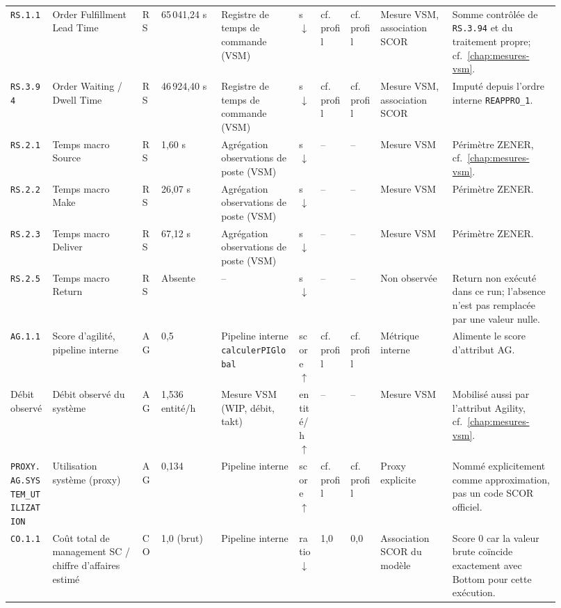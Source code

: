 \begin{landscape}
{\begin{longtable}{L{0.07\linewidth} L{0.15\linewidth} L{0.035\linewidth} L{0.10\linewidth} L{0.13\linewidth} L{0.035\linewidth} L{0.05\linewidth} L{0.05\linewidth} L{0.12\linewidth} L{0.18\linewidth}}
\texttt{RS.1.1} & Order Fulfillment Lead Time & RS & 65\,041,24 s & Registre de temps de commande (VSM) & s $\downarrow$ & cf.~profil & cf.~profil & Mesure VSM, association SCOR & Somme contrôlée de \texttt{RS.3.94} et du traitement propre; cf.~\cref{chap:mesures-vsm}. \\
\texttt{RS.3.94} & Order Waiting / Dwell Time & RS & 46\,924,40 s & Registre de temps de commande (VSM) & s $\downarrow$ & cf.~profil & cf.~profil & Mesure VSM, association SCOR & Imputé depuis l'ordre interne \texttt{REAPPRO\_1}. \\
\texttt{RS.2.1} & Temps macro Source & RS & 1,60 s & Agrégation observations de poste (VSM) & s $\downarrow$ & -- & -- & Mesure VSM & Périmètre ZENER, cf.~\cref{chap:mesures-vsm}. \\
\texttt{RS.2.2} & Temps macro Make & RS & 26,07 s & Agrégation observations de poste (VSM) & s $\downarrow$ & -- & -- & Mesure VSM & Périmètre ZENER. \\
\texttt{RS.2.3} & Temps macro Deliver & RS & 67,12 s & Agrégation observations de poste (VSM) & s $\downarrow$ & -- & -- & Mesure VSM & Périmètre ZENER. \\
\texttt{RS.2.5} & Temps macro Return & RS & Absente & -- & s $\downarrow$ & -- & -- & Non observée & Return non exécuté dans ce run; l'absence n'est pas remplacée par une valeur nulle. \\

\texttt{AG.1.1} & Score d'agilité, pipeline interne & AG & 0,5 & Pipeline interne \texttt{calculerPIGlobal} & score $\uparrow$ & cf.~profil & cf.~profil & Métrique interne & Alimente le score d'attribut AG. \\
Débit observé & Débit observé du système & AG & 1,536 entité/h & Mesure VSM (WIP, débit, takt) & entité/h $\uparrow$ & -- & -- & Mesure VSM & Mobilisé aussi par l'attribut Agility, cf.~\cref{chap:mesures-vsm}. \\
\texttt{PROXY.AG.\allowbreak SYSTEM\_\allowbreak UTILIZATION} & Utilisation système (proxy) & AG & 0,134 & Pipeline interne & score $\uparrow$ & cf.~profil & cf.~profil & Proxy explicite & Nommé explicitement comme approximation, pas un code SCOR officiel. \\

\texttt{CO.1.1} & Coût total de management SC / chiffre d'affaires estimé & CO & 1,0 (brut) & Pipeline interne & ratio $\downarrow$ & 1,0 & 0,0 & Association SCOR du modèle & Score 0 car la valeur brute coïncide exactement avec Bottom pour cette exécution. \\


\end{longtable}}
\end{landscape}
